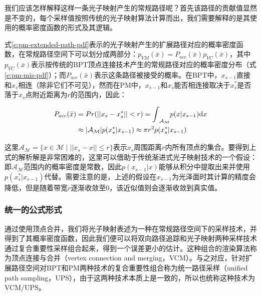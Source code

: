 我们应该怎样解释这样一条光子映射产生的常规路径呢？首先该路径的贡献值显然是不变的，每个采样值按照传统的光子映射算法计算而出，我们需要解释的是其使用的概率密度函数的形式及其逻辑。

式\ref{e:pm-extended-path-pdf}表示的光子映射产生的扩展路径对应的概率密度函数，在常规路径空间下可以划分成两部分：$p_{VM}(\bar{x})=P_{acc}(\bar{x})p_{VC}(\bar{x})$，其中$p_{VC}(\bar{x})$表示按传统的BPT顶点连接技术产生的常规路径对应的概率密度分布（式\ref{e:pm-mis-pdf}）；而$P_{acc}(\bar{x})$表示这条路径被接受的概率。在BPT中，$x_{s-1}$直接和$x_s$相连（除非它们不可见），然而在PM中，$x_{s-1}$和$x_s$能否相连接取决于$x^{*}_s$是否落于$x_s$点附近距离为$r$的范围内，因此：

\begin{equation}
\begin{aligned}
	P_{acc}(\bar{x})&=Pr(||x_s-x^{*}_s||<r)={\rm \int}_{\mathcal{A}_{\mathcal{M}}}p(x|x_{s-1}){\rm d}x\\
	&\approx |\mathcal{A}_{\mathcal{M}}|p(x^{*}_s|x_{s-1})\approx\pi r^{2}p(x^{*}_s|x_{s-1})
\end{aligned}
\end{equation}

这里$\mathcal{A}_{\mathcal{M}}=\{x\in\mathcal{M}\mid||x_s-x||\leq r \}$表示$x_s$周围距离$r$内所有顶点的集合。要得到上式的解析解是非常困难的，这里可以借助于传统渐进式光子映射技术的一个假设：即$\mathcal{A}_{\mathcal{M}}$范围内的概率密度是常数，因此$p(x_{s-1}|x)$能够从积分中提取出来并使用$p(x^{*}_s|x_{s-1})$代替。需要注意的是，上述的假设在$x_{s-1}$为光泽面时其计算的精度会降低，但是随着带宽$r$逐渐收敛至0，该近似值则会逐渐收敛到真实值。





\subsubsection{统一的公式形式}
通过使用顶点合并，我们将光子映射表述为一种在常规路径空间下的采样技术，并得到了其概率密度函数，因此我们便可以将双向路径追踪和光子映射两种采样技术通过复合重要性采样组合起来，得到一个误差更小的估计。这种组合的渲染算法称为顶点连接与合并（vertex connection and merging，VCM）。与之对应，\cite{a:APathSpaceExtensionforRobustLightTransportSimulation}针对扩展路径空间对BPT和PM两种技术的复合重要性组合称为统一路径采样（unified path sampling，UPS），由于这两种技术本质上是一致的，所以也统称这种技术为VCM/UPS。

